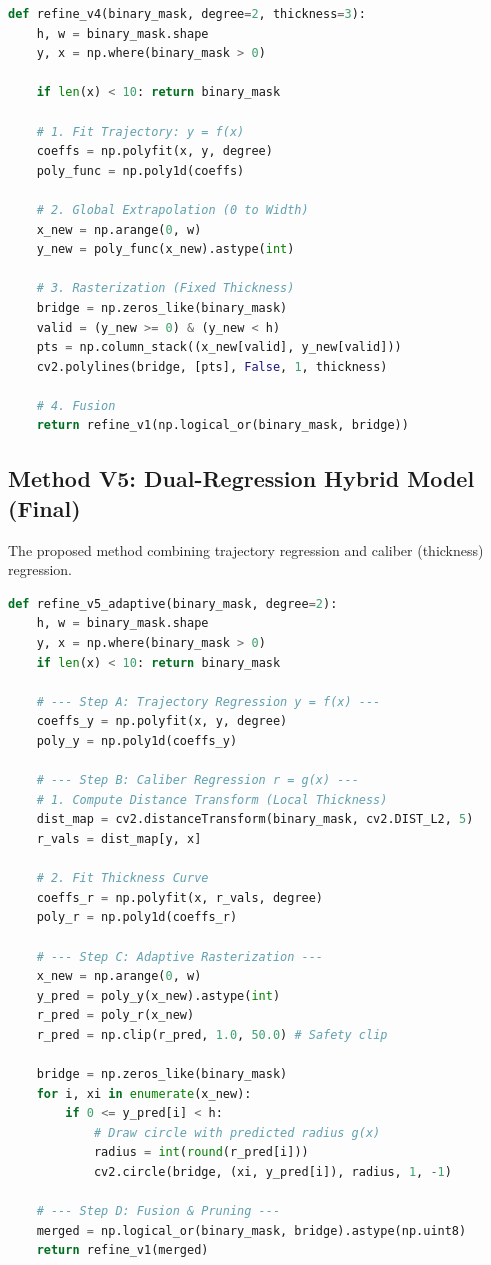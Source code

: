 \documentclass[twocolumn, 10pt, a4paper]{article}
\begin{document}
\begin{lstlisting}[language=Python, caption=topo\_analysis\_v4.py]
def refine_v4(binary_mask, degree=2, thickness=3):
    h, w = binary_mask.shape
    y, x = np.where(binary_mask > 0)
    
    if len(x) < 10: return binary_mask

    # 1. Fit Trajectory: y = f(x)
    coeffs = np.polyfit(x, y, degree)
    poly_func = np.poly1d(coeffs)

    # 2. Global Extrapolation (0 to Width)
    x_new = np.arange(0, w)
    y_new = poly_func(x_new).astype(int)

    # 3. Rasterization (Fixed Thickness)
    bridge = np.zeros_like(binary_mask)
    valid = (y_new >= 0) & (y_new < h)
    pts = np.column_stack((x_new[valid], y_new[valid]))
    cv2.polylines(bridge, [pts], False, 1, thickness)

    # 4. Fusion
    return refine_v1(np.logical_or(binary_mask, bridge))
\end{lstlisting}

\subsection{Method V5: Dual-Regression Hybrid Model (Final)}
The proposed method combining trajectory regression and caliber (thickness) regression.

\begin{lstlisting}[language=Python, caption=topo\_analysis\_v5.py]
def refine_v5_adaptive(binary_mask, degree=2):
    h, w = binary_mask.shape
    y, x = np.where(binary_mask > 0)
    if len(x) < 10: return binary_mask

    # --- Step A: Trajectory Regression y = f(x) ---
    coeffs_y = np.polyfit(x, y, degree)
    poly_y = np.poly1d(coeffs_y)

    # --- Step B: Caliber Regression r = g(x) ---
    # 1. Compute Distance Transform (Local Thickness)
    dist_map = cv2.distanceTransform(binary_mask, cv2.DIST_L2, 5)
    r_vals = dist_map[y, x]
    
    # 2. Fit Thickness Curve
    coeffs_r = np.polyfit(x, r_vals, degree)
    poly_r = np.poly1d(coeffs_r)

    # --- Step C: Adaptive Rasterization ---
    x_new = np.arange(0, w)
    y_pred = poly_y(x_new).astype(int)
    r_pred = poly_r(x_new)
    r_pred = np.clip(r_pred, 1.0, 50.0) # Safety clip

    bridge = np.zeros_like(binary_mask)
    for i, xi in enumerate(x_new):
        if 0 <= y_pred[i] < h:
            # Draw circle with predicted radius g(x)
            radius = int(round(r_pred[i]))
            cv2.circle(bridge, (xi, y_pred[i]), radius, 1, -1)

    # --- Step D: Fusion & Pruning ---
    merged = np.logical_or(binary_mask, bridge).astype(np.uint8)
    return refine_v1(merged)
\end{lstlisting}
\end{document}

